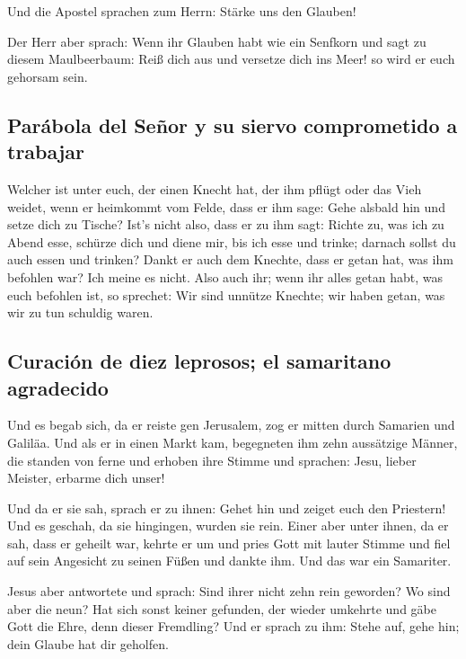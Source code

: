  Und die Apostel sprachen zum Herrn: Stärke uns den
Glauben!

 Der Herr aber sprach: Wenn ihr Glauben habt wie ein
Senfkorn und sagt zu diesem Maulbeerbaum: Reiß dich aus und versetze
dich ins Meer! so wird er euch gehorsam sein.

\hypertarget{paruxe1bola-del-seuxf1or-y-su-siervo-comprometido-a-trabajar}{%
\subsection{Parábola del Señor y su siervo comprometido a
trabajar}\label{paruxe1bola-del-seuxf1or-y-su-siervo-comprometido-a-trabajar}}

 Welcher ist unter euch, der einen Knecht hat, der ihm
pflügt oder das Vieh weidet, wenn er heimkommt vom Felde, dass er ihm
sage: Gehe alsbald hin und setze dich zu Tische?  Ist's
nicht also, dass er zu ihm sagt: Richte zu, was ich zu Abend esse,
schürze dich und diene mir, bis ich esse und trinke; darnach sollst du
auch essen und trinken?  Dankt er auch dem Knechte, dass
er getan hat, was ihm befohlen war? Ich meine es nicht. 
Also auch ihr; wenn ihr alles getan habt, was euch befohlen ist, so
sprechet: Wir sind unnütze Knechte; wir haben getan, was wir zu tun
schuldig waren.

\hypertarget{curaciuxf3n-de-diez-leprosos-el-samaritano-agradecido}{%
\subsection{Curación de diez leprosos; el samaritano
agradecido}\label{curaciuxf3n-de-diez-leprosos-el-samaritano-agradecido}}

 Und es begab sich, da er reiste gen Jerusalem, zog er
mitten durch Samarien und Galiläa.  Und als er in einen
Markt kam, begegneten ihm zehn aussätzige Männer, die standen von ferne
 und erhoben ihre Stimme und sprachen: Jesu, lieber
Meister, erbarme dich unser!

 Und da er sie sah, sprach er zu ihnen: Gehet hin und
zeiget euch den Priestern! Und es geschah, da sie hingingen, wurden sie
rein.  Einer aber unter ihnen, da er sah, dass er geheilt
war, kehrte er um und pries Gott mit lauter Stimme  und
fiel auf sein Angesicht zu seinen Füßen und dankte ihm. Und das war ein
Samariter.

 Jesus aber antwortete und sprach: Sind ihrer nicht zehn
rein geworden? Wo sind aber die neun?  Hat sich sonst
keiner gefunden, der wieder umkehrte und gäbe Gott die Ehre, denn dieser
Fremdling?  Und er sprach zu ihm: Stehe auf, gehe hin;
dein Glaube hat dir geholfen.

